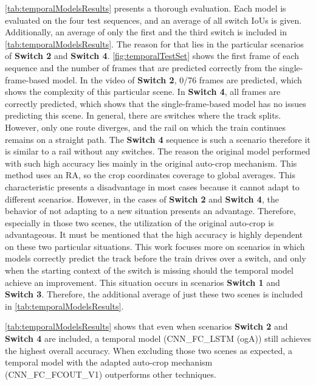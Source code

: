 \autoref{tab:temporalModelsResults} presents a thorough evaluation.
Each model is evaluated on the four test sequences, and an average of all switch \ac{IoU}s is given.
Additionally, an average of only the first and the third switch is included in \autoref{tab:temporalModelsResults}.
The reason for that lies in the particular scenarios of \textbf{Switch 2} and \textbf{Switch 4}.
\autoref{fig:temporalTestSet} shows the first frame of each sequence and the number of frames that are predicted correctly from the single-frame-based model.
In the video of \textbf{Switch 2}, 0/76 frames are predicted, which shows the complexity of this particular scene.
In \textbf{Switch 4}, all frames are correctly predicted, which shows that the single-frame-based model has no issues predicting this scene.
In general, there are switches where the track splits.
However, only one route diverges, and the rail on which the train continues remains on a straight path.
The \textbf{Switch 4} sequence is such a scenario therefore it is similar to a rail without any switches.
The reason the original model performed with such high accuracy lies mainly in the original auto-crop mechanism.
This method uses an \ac{RA}, so the crop coordinates coverage to global averages.
This characteristic presents a disadvantage in most cases because it cannot adapt to different scenarios.
However, in the cases of \textbf{Switch 2} and \textbf{Switch 4}, the behavior of not adapting to a new situation presents an advantage.
Therefore, especially in those two scenes, the utilization of the original auto-crop is advantageous.
It must be mentioned that the high accuracy is highly dependent on these two particular situations.
This work focuses more on scenarios in which models correctly predict the track before the train drives over a switch, and only when the starting context of the switch is missing should the temporal model achieve an improvement.
This situation occurs in scenarios \textbf{Switch 1} and \textbf{Switch 3}.
Therefore, the additional average of just these two scenes is included in \autoref{tab:temporalModelsResults}.

\autoref{tab:temporalModelsResults} shows that even when scenarios \textbf{Switch 2} and \textbf{Switch 4} are included, a temporal model (CNN\_FC\_LSTM (ogA)) still achieves the highest overall accuracy.
When excluding those two scenes as expected, a temporal model with the adapted auto-crop mechanism (CNN\_FC\_FCOUT\_V1) outperforms other techniques.

